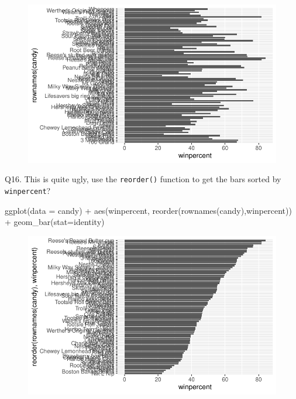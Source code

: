 \documentclass[
  letterpaper,
  DIV=11,
  numbers=noendperiod]{scrartcl}
\newenvironment{Shaded}{\begin{snugshade}}{\end{snugshade}}
\newcommand{\AttributeTok}[1]{\textcolor[rgb]{0.40,0.45,0.13}{#1}}
\newcommand{\FunctionTok}[1]{\textcolor[rgb]{0.28,0.35,0.67}{#1}}
\newcommand{\NormalTok}[1]{\textcolor[rgb]{0.00,0.23,0.31}{#1}}
\newcommand{\SpecialCharTok}[1]{\textcolor[rgb]{0.37,0.37,0.37}{#1}}
\newcommand{\StringTok}[1]{\textcolor[rgb]{0.13,0.47,0.30}{#1}}
\begin{document}
\begin{figure}[H]

{\centering \includegraphics{class10_project_files/figure-pdf/unnamed-chunk-13-1.pdf}

}

\end{figure}

Q16. This is quite ugly, use the \texttt{reorder()} function to get the
bars sorted by \texttt{winpercent}?

\begin{Shaded}
\begin{Highlighting}[]
\FunctionTok{ggplot}\NormalTok{(}\AttributeTok{data =}\NormalTok{ candy) }\SpecialCharTok{+}
  \FunctionTok{aes}\NormalTok{(winpercent, }\FunctionTok{reorder}\NormalTok{(}\FunctionTok{rownames}\NormalTok{(candy),winpercent)) }\SpecialCharTok{+} 
  \FunctionTok{geom\_bar}\NormalTok{(}\AttributeTok{stat=}\StringTok{\textquotesingle{}identity\textquotesingle{}}\NormalTok{)}
\end{Highlighting}
\end{Shaded}

\begin{figure}[H]

{\centering \includegraphics{class10_project_files/figure-pdf/unnamed-chunk-14-1.pdf}

}

\end{figure}
\end{document}
